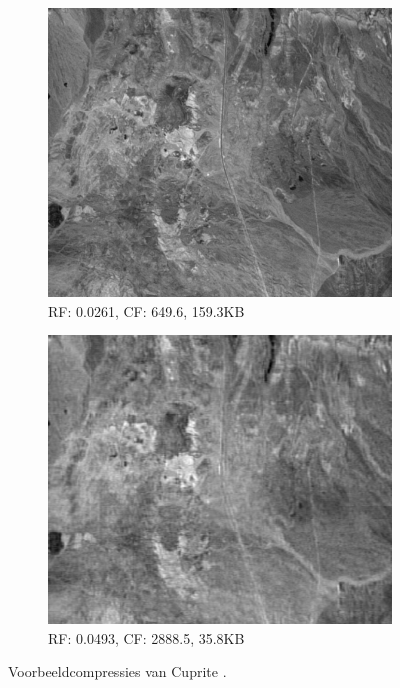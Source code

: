\begin{figure}[]
\centering
\ContinuedFloat
\begin{subfigure}{\textwidth}
  \centering
  \includegraphics[scale=0.55]{images/example_compression_Cuprite_0_025.png}
  \caption{RF: 0.0261, CF: 649.6, 159.3KB}
\end{subfigure}
\begin{subfigure}{\textwidth}
  \centering
  \includegraphics[scale=0.55]{images/example_compression_Cuprite_0_05.png}
  \caption{RF: 0.0493, CF: 2888.5, 35.8KB}
\end{subfigure}
\caption{Voorbeeldcompressies van Cuprite \cite{ref:ehu_aviris}.}
\end{figure}

